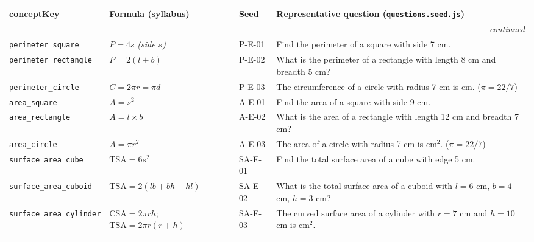 \documentclass[12pt,a4paper]{article}
\begin{document}
\setlength{\tabcolsep}{8pt}
\renewcommand{\arraystretch}{1.45}
\begin{longtable}{@{}p{2.6cm} p{3.8cm} p{1cm} >{\RaggedRight\arraybackslash}p{6.8cm}@{}}
\toprule
\rowcolor{headerbg}
\color{white}\textbf{conceptKey} & \color{white}\textbf{Formula (syllabus)} & \color{white}\textbf{Seed} & \color{white}\textbf{Representative question (\texttt{questions.seed.js})} \\
\midrule
\endhead
\midrule
\multicolumn{4}{r}{\itshape continued} \\
\midrule
\endfoot
\bottomrule
\endlastfoot

\texttt{perimeter\_square} &
$P = 4s$ \quad\textit{(side $s$)} & P-E-01 &
Find the perimeter of a square with side 7 cm. \\ \rowcolor{rowhighlight}

\texttt{perimeter\_rectangle} &
$P = 2(l+b)$ & P-E-02 &
What is the perimeter of a rectangle with length 8 cm and breadth 5 cm? \\

\texttt{perimeter\_circle} &
$C = 2\pi r = \pi d$ & P-E-03 &
The circumference of a circle with radius 7 cm is \underline{\hspace{1.2cm}} cm. ($\pi=22/7$) \\ \rowcolor{rowhighlight}

\texttt{area\_square} &
$A = s^2$ & A-E-01 &
Find the area of a square with side 9 cm. \\

\texttt{area\_rectangle} &
$A = l \times b$ & A-E-02 &
What is the area of a rectangle with length 12 cm and breadth 7 cm? \\ \rowcolor{rowhighlight}

\texttt{area\_circle} &
$A = \pi r^2$ & A-E-03 &
The area of a circle with radius 7 cm is \underline{\hspace{1.2cm}} cm$^2$. ($\pi=22/7$) \\

\texttt{surface\_area\_cube} &
$\mathrm{TSA} = 6s^2$ & SA-E-01 &
Find the total surface area of a cube with edge 5 cm. \\ \rowcolor{rowhighlight}

\texttt{surface\_area\_cuboid} &
$\mathrm{TSA} = 2(lb + bh + hl)$ & SA-E-02 &
What is the total surface area of a cuboid with $l=6$ cm, $b=4$ cm, $h=3$ cm? \\

\texttt{surface\_area\_cylinder} &
$\mathrm{CSA} = 2\pi rh$;\ $\mathrm{TSA} = 2\pi r(r+h)$ & SA-E-03 &
The curved surface area of a cylinder with $r=7$ cm and $h=10$ cm is \underline{\hspace{1.2cm}} cm$^2$. \\ \rowcolor{rowhighlight}


\end{longtable}
\end{document}
